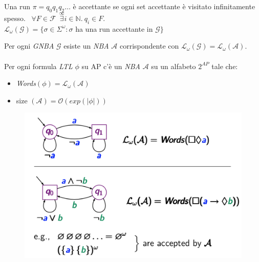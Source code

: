 \documentclass[a4paper, notitlepage, 9pt]{extreport}
\begin{document}
\noindent
Una run $\pi = q_0 q_1 q_2 \dots$ è accettante se ogni set accettante è visitato infinitamente spesso. ~$\forall F \in \mathcal{F} ~~\stackrel{\infty}{\exists} i \in \mathbb{N}. ~q_i \in F$.\\
$\mathcal{L}_\omega(\mathcal{G}) = \{\sigma \in \Sigma^\omega: \sigma$ ha una run accettante in $\mathcal{G} \}$\\
\begin{multicols}{2}
	\noindent
	Per ogni \textit{GNBA} $\mathcal{G}$ esiste un \textit{NBA} $\mathcal{A}$ corrispondente con $\mathcal{L}_\omega(\mathcal{G}) = \mathcal{L}_\omega(\mathcal{A})$.\\\\
	Per ogni formula \textit{LTL} $\phi$ su AP c'è un \textit{NBA} $\mathcal{A}$ su un alfabeto $2^{AP}$ tale che:
	\begin{itemize}
		\item \textit{Words}$(\phi) = \mathcal{L}_\omega(\mathcal{A})$
		\item size $(\mathcal{A}) = \mathcal{O}(exp (|\phi|))$
	\end{itemize}
	\columnbreak
	\begin{figure}[H]
		\centering
		\includegraphics[scale=0.24]{NBA}
	\end{figure}
\end{multicols}
\end{document}
